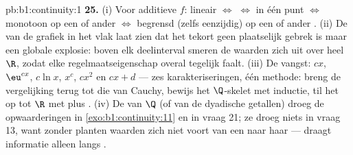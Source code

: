 \begin{solution}{pb:b1:continuity:1}
\textbf{25.} (i) Voor additieve $f$: lineair $\iff$  $\iff$
 in één punt $\iff$ monotoon op een of ander  $\iff$
begrensd (zelfs eenzijdig) op een of ander . (ii) De
 van de grafiek in het vlak laat zien dat het tekort geen
plaatselijk gebrek is maar een globale explosie: boven elk
deelinterval smeren de waarden zich uit over heel $\R$, zodat elke
regelmaatseigenschap overal tegelijk faalt. (iii) De vangst: $cx$,
$\eu^{cx}$, $c\ln x$, $x^c$, $cx^2$ en $cx + d$ --- zes
karakteriseringen, één methode: breng de vergelijking terug tot die
van Cauchy, bewijs het $\Q$-skelet met inductie, til het op tot $\R$
met  plus . (iv) De  van $\Q$ (of van
de dyadische getallen) droeg de opwaarderingen in
\cref{exo:b1:continuity:11} en in vraag 21; ze droeg niets in vraag
13, want zonder  planten waarden zich niet voort van een
  naar haar  ---  draagt
informatie alleen langs .
\end{solution}
